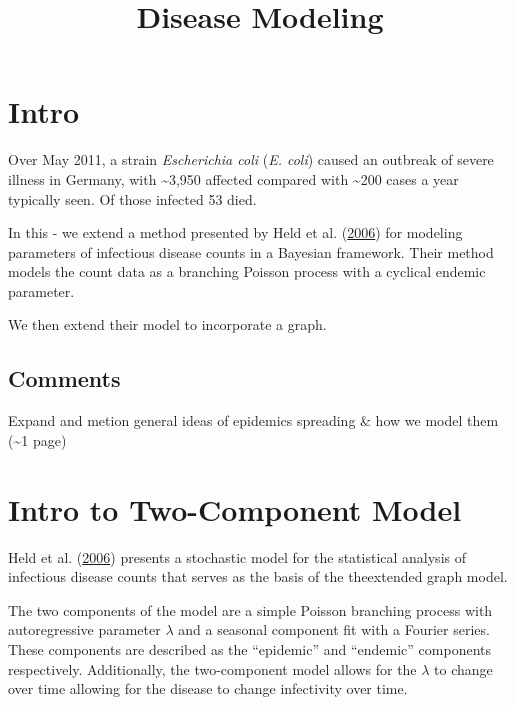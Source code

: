 \documentclass[]{article}
\title{Disease Modeling}
\author{}
\date{}
\numberwithin{equation}{section}
\begin{document}
\maketitle

{
\setcounter{tocdepth}{2}
\tableofcontents
}
\hypertarget{intro}{%
\section{Intro}\label{intro}}

Over May 2011, a strain \emph{Escherichia coli} (\emph{E. coli}) caused
an outbreak of severe illness in Germany, with \textasciitilde{}3,950
affected compared with \textasciitilde{}200 cases a year typically seen.
Of those infected 53 died.

In this - we extend a method presented by Held et al.
(\protect\hyperlink{ref-held_two-component_2006}{2006}) for modeling
parameters of infectious disease counts in a Bayesian framework. Their
method models the count data as a branching Poisson process with a
cyclical endemic parameter.

We then extend their model to incorporate a graph.

\hypertarget{comments}{%
\subsection{Comments}\label{comments}}

Expand and metion general ideas of epidemics spreading \& how we model
them (\textasciitilde{}1 page)

\hypertarget{intro-to-two-component-model}{%
\section{Intro to Two-Component
Model}\label{intro-to-two-component-model}}

Held et al. (\protect\hyperlink{ref-held_two-component_2006}{2006})
presents a stochastic model for the statistical analysis of infectious
disease counts that serves as the basis of the theextended graph model.

The two components of the model are a simple Poisson branching process
with autoregressive parameter \(\lambda\) and a seasonal component fit
with a Fourier series. These components are described as the
``epidemic'' and ``endemic'' components respectively. Additionally, the
two-component model allows for the \(\lambda\) to change over time
allowing for the disease to change infectivity over time.
\end{document}

